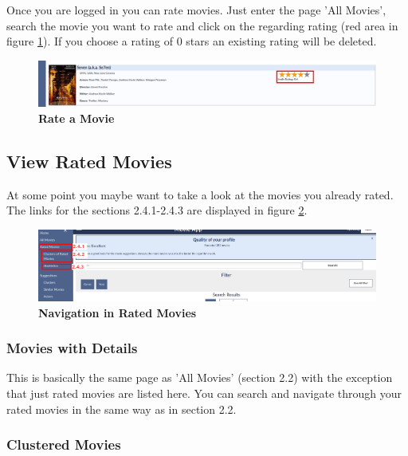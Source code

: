 \documentclass{article}
\begin{document}
Once you are logged in you can rate movies. Just enter the page 'All Movies', search the movie you want to rate and click on the regarding rating (red area in figure \ref{fig_rate_movie_ex1}). If you choose a rating of 0 stars an existing rating will be deleted.
\begin{figure}[t!]
\includegraphics[scale=0.3]{screenshots_app/rate_movie_ex1.png}
\caption{\textbf{Rate a Movie}}\label{fig_rate_movie_ex1}
\end{figure}


\subsection{View Rated Movies}

At some point you maybe want to take a look at the movies you already rated. The links for the sections 2.4.1-2.4.3 are displayed in figure \ref{fig_rated_movies_navigation}.
\begin{figure}[t!]
\includegraphics[scale=0.3]{screenshots_app/rated_movies_navigation.png}
\caption{\textbf{Navigation in Rated Movies}}\label{fig_rated_movies_navigation}
\end{figure}


\subsubsection{Movies with Details}

This is basically the same page as 'All Movies' (section 2.2) with the exception that just rated movies are listed here. You can search and navigate through your rated movies in the same way as in section 2.2.

\subsubsection{Clustered Movies}
\end{document}
